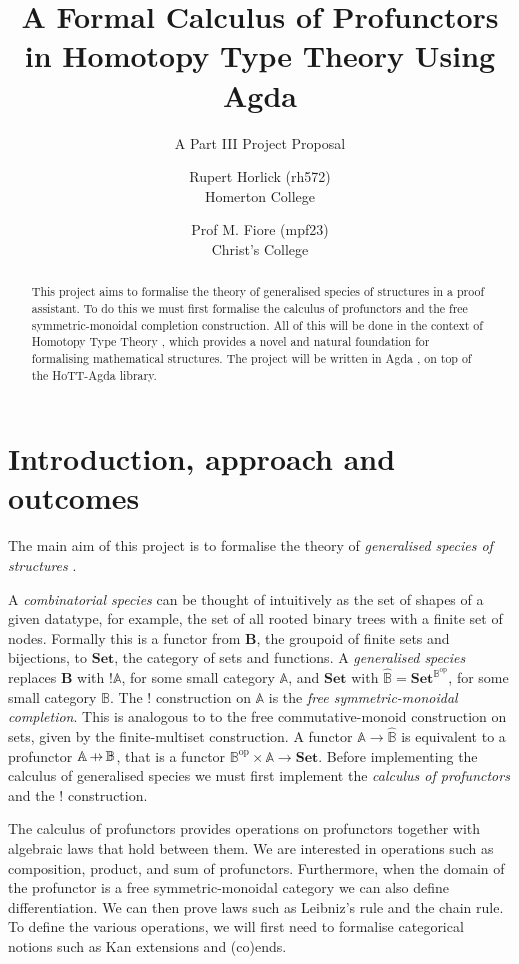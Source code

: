 \documentclass[12pt, parskip]{scrartcl}
\title{A Formal Calculus of Profunctors in Homotopy Type Theory Using Agda}
\subtitle{A Part III Project Proposal}
\date{}
\author{Rupert Horlick (rh572) \\
  \large Homerton College \\
  \and
  Prof M. Fiore (mpf23) \\
  \large Christ's College}
\DeclareMathOperator\prof{\ooalign{\hss$\Mapsfromchar$\hss\cr$\to$}}
\begin{document}
\maketitle

\begin{abstract}
  This project aims to formalise the theory of generalised species of structures \cite{fiore2008cartesian} in a proof assistant. To do this we must first formalise the calculus of profunctors and the free symmetric-monoidal completion construction. All of this will be done in the context of Homotopy Type Theory \cite{hottbook}, which provides a novel and natural foundation for formalising mathematical structures. The project will be written in Agda \cite{norell2007towards}, on top of the HoTT-Agda \cite{hottagda} library.
\end{abstract}

\section{Introduction, approach and outcomes}

The main aim of this project is to formalise the theory of \emph{generalised species of structures} \cite{fiore2008cartesian}.

A \emph{combinatorial species} \cite{joyal1986foncteurs} can be thought of intuitively as the set of shapes of a given datatype, for example, the set of all rooted binary trees with a finite set of nodes. Formally this is a functor from $\mathbf{B}$, the groupoid of finite sets and bijections, to $\mathbf{Set}$, the category of sets and functions. A \emph{generalised species} replaces $\mathbf{B}$ with $!\mathbb{A}$, for some small category $\mathbb{A}$, and $\mathbf{Set}$ with $\widehat{\mathbb{B}} = \mathbf{Set}^{\mathbb{B}^{\mathrm{op}}}$, for some small category $\mathbb{B}$. The $!$ construction on $\mathbb{A}$ is the \emph{free symmetric-monoidal completion}. This is analogous to to the free commutative-monoid construction on sets, given by the finite-multiset construction. A functor $\mathbb{A} \to \widehat{\mathbb{B}}$ is equivalent to a profunctor \cite{benabou1973distributeurs} $\mathbb{A} \prof \mathbb{B}$, that is a functor $\mathbb{B}^{\mathrm{op}} \times \mathbb{A} \to \mathbf{Set}$. Before implementing the calculus of generalised species we must first implement the \emph{calculus of profunctors} and the $!$ construction.

The calculus of profunctors provides operations on profunctors together with algebraic laws that hold between them. We are interested in operations such as composition, product, and sum of profunctors. Furthermore, when the domain of the profunctor is a free symmetric-monoidal category we can also define differentiation. We can then prove laws such as Leibniz's rule and the chain rule. To define the various operations, we will first need to formalise categorical notions such as Kan extensions and (co)ends.
\end{document}
